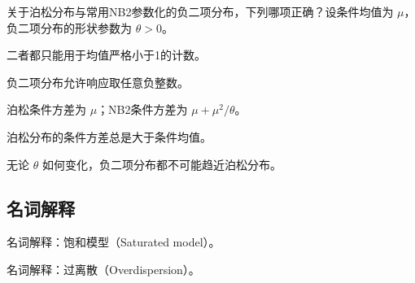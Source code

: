 \par\addvspace{8pt}\noindent\begin{minipage}{\linewidth}


关于泊松分布与常用NB2参数化的负二项分布，下列哪项正确？设条件均值为 \(\mu\)，负二项分布的形状参数为 \(\theta>0\)。


\begin{choices}

\item 二者都只能用于均值严格小于1的计数。

\item 负二项分布允许响应取任意负整数。

\item 泊松条件方差为 \(\mu\)；NB2条件方差为 \(\mu+\mu^2/\theta\)。

\item 泊松分布的条件方差总是大于条件均值。

\item 无论 \(\theta\) 如何变化，负二项分布都不可能趋近泊松分布。

\end{choices}

\end{minipage}\par\vspace{5pt}

\par\addvspace{8pt}\noindent\begin{minipage}{\linewidth}

\subsection{名词解释}


名词解释：饱和模型（Saturated model）。



\end{minipage}\par\vspace{5pt}

\par\addvspace{8pt}\noindent\begin{minipage}{\linewidth}


名词解释：过离散（Overdispersion）。



\end{minipage}\par\vspace{5pt}

